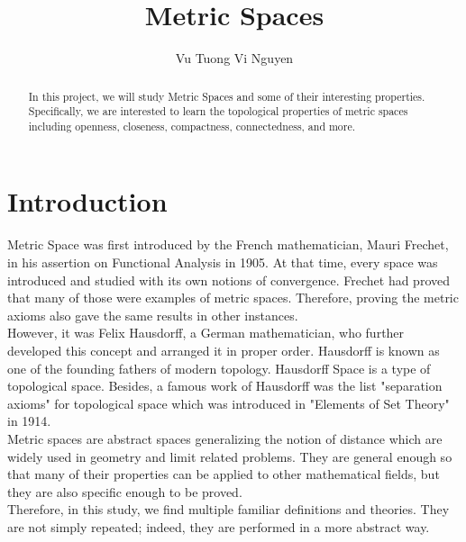 \documentclass[12pt, reqno]{amsart}
\theoremstyle{definition}
\numberwithin{equation}{section}
\newcommand{\tabb}{\hspace*{1cm}}
\begin{document}

\title{Metric Spaces}



\author{Vu Tuong Vi Nguyen}



\begin{abstract}
In this project, we will study Metric Spaces and some of their interesting properties. Specifically, we are interested to learn the topological properties of metric spaces including openness, closeness, compactness, connectedness, and more.
\end{abstract}

\maketitle







\doublespacing

\section{Introduction}
    \tabb Metric Space was first introduced by the French mathematician, Mauri Frechet, in his assertion on Functional Analysis in 1905. At that time, every space was introduced and studied with its own notions of convergence. Frechet had proved that many of those were examples of metric spaces. Therefore, proving the metric axioms also gave the same results in other instances. \\
\tabb However, it was Felix Hausdorff, a German mathematician, who further developed this concept and arranged it in proper order. Hausdorff is known as one of the founding fathers of modern topology. Hausdorff Space is a type of topological space. Besides, a famous work of Hausdorff was the list "separation axioms" for topological space which was introduced in "Elements of Set Theory" in 1914.\\
\tabb Metric spaces are abstract spaces generalizing the notion of distance which are widely used in geometry and limit related problems. They are general enough so that many of their properties can be applied to other mathematical fields, but they are also specific enough to be proved.\\
\tabb Therefore, in this study, we find multiple familiar definitions and theories. They are not simply repeated; indeed, they are performed in a more abstract way.\\
\end{document}
